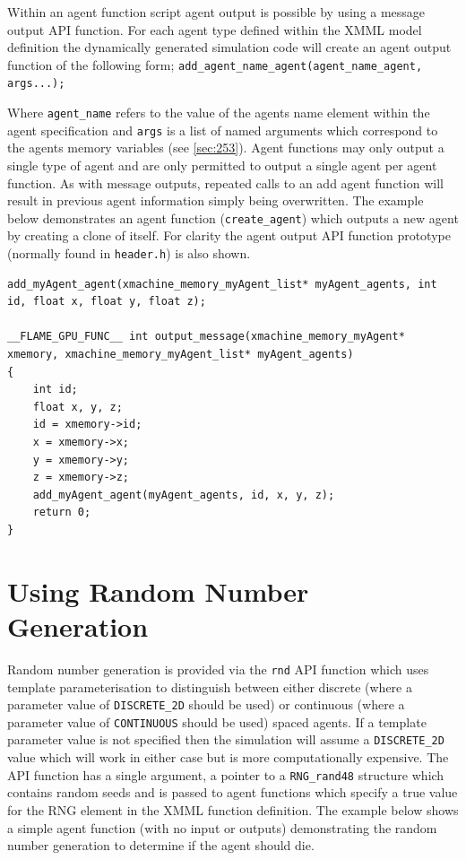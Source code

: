 \documentclass[11pt, a4paper, onecolumn, oneside]{report}
\begin{document}
Within an agent function script agent output is possible by using a message output API function.
For each agent type defined within the XMML model definition the dynamically generated simulation code will create an agent output function of the following form; 
\texttt{add_agent_name_agent(agent_name_agent, args...);}

Where \texttt{agent_name} refers to the value of the agents name element within the agent specification and \texttt{args} is a list of named arguments which correspond to the agents memory variables (see \cref{sec:253}).
Agent functions may only output a single type of agent and are only permitted to output a single agent per agent function.
As with message outputs, repeated calls to an add agent function will result in previous agent information simply being overwritten.
The example below demonstrates an agent function (\texttt{create_agent}) which outputs a new agent by creating a clone of itself.
For clarity the agent output API function prototype (normally found in \texttt{header.h}) is also shown.

\begin{verbatim}
add_myAgent_agent(xmachine_memory_myAgent_list* myAgent_agents, int id, float x, float y, float z);

__FLAME_GPU_FUNC__ int output_message(xmachine_memory_myAgent* xmemory, xmachine_memory_myAgent_list* myAgent_agents)
{
    int id;
    float x, y, z;
    id = xmemory->id;
    x = xmemory->x;
    y = xmemory->y;
    z = xmemory->z;
    add_myAgent_agent(myAgent_agents, id, x, y, z);
    return 0;
}
\end{verbatim}


\section{Using Random Number Generation}
\label{sec:37}


Random number generation is provided via the \texttt{rnd} API function which uses template parameterisation to distinguish between either discrete (where a parameter value of \texttt{DISCRETE_2D} should be used) or continuous (where a parameter value of \texttt{CONTINUOUS} should be used) spaced agents.
If a template parameter value is not specified then the simulation will assume a \texttt{DISCRETE_2D} value which will work in either case but is more computationally expensive.
The API function has a single argument, a pointer to a \texttt{RNG_rand48} structure which contains random seeds and is passed to agent functions which specify a true value for the RNG element in the XMML function definition.
The example below shows a simple agent function (with no input or outputs) demonstrating the random number generation to determine if the agent should die.
\end{document}
